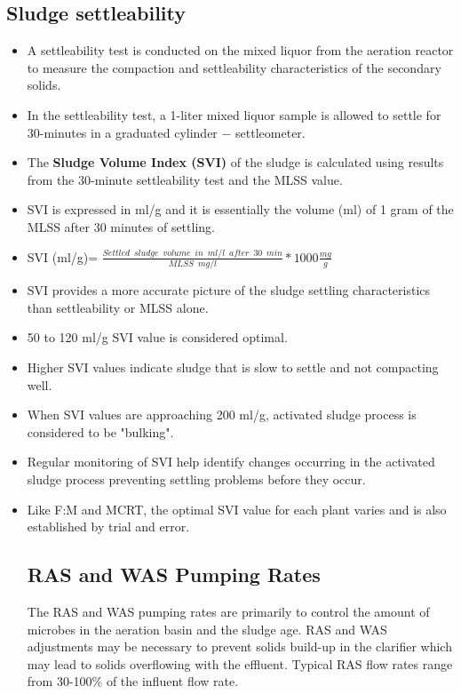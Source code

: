 \subsection{Sludge settleability}
\vspace{5mm}
\begin{itemize}
\item A settleability test is conducted on the mixed liquor from the aeration reactor to  measure the compaction and settleability characteristics of the secondary solids.
\item In the settleability test, a 1-liter mixed liquor sample is allowed to settle for 30-minutes in a graduated cylinder $-$ settleometer. 
\item The \textbf{Sludge Volume Index (SVI)} of the sludge is calculated using results from the 30-minute settleability test and the MLSS value.
\item SVI is expressed in ml/g and it is essentially the volume (ml) of 1 gram of the MLSS after 30 minutes of settling.
\item SVI (ml/g)= $\frac{Settled \enspace sludge \enspace volume \enspace in \enspace ml/l \enspace after \enspace 30 \enspace min}{MLSS \enspace mg/l}*1000 \frac{mg}{g}$
\item SVI provides a more accurate picture of the sludge settling characteristics than settleability or MLSS alone.
\item 50 to 120 ml/g SVI value is considered optimal.
\item Higher SVI values  indicate sludge that is slow to settle and not compacting well.
\item When SVI values are approaching 200 ml/g, activated sludge process is considered to be "bulking".
\item Regular monitoring of SVI help identify changes occurring in the activated sludge process preventing settling problems before they occur.
\item Like F:M and MCRT, the optimal SVI value for each plant varies and is also established by trial and error.

\subsection{RAS and WAS Pumping Rates}
The RAS and WAS pumping rates are primarily to control the amount of microbes in the aeration basin and the sludge age.  RAS and WAS adjustments may be necessary to prevent solids build-up in the clarifier which may lead to solids overflowing  with the effluent. Typical RAS flow rates range from 30-100\% of the influent flow rate.
\end{itemize}

